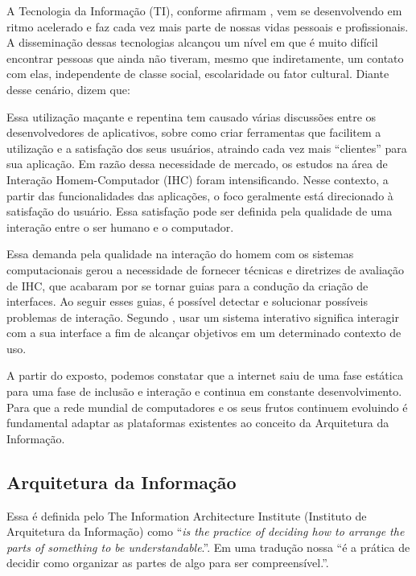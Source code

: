\documentclass[12pt]{article}
\begin{document}
A Tecnologia da Informação (TI), conforme afirmam , vem se desenvolvendo em ritmo acelerado e faz cada vez mais parte de nossas vidas pessoais e profissionais. A disseminação dessas tecnologias alcançou um nível em que é muito difícil encontrar pessoas que ainda não tiveram, mesmo que indiretamente, um contato com elas, independente de classe social, escolaridade ou fator cultural.
Diante desse cenário,   dizem que:
\begin{quoting}[rightmargin=0cm,leftmargin=4cm]
{\footnotesize 
Essa utilização maçante e repentina tem causado várias discussões entre os desenvolvedores de aplicativos, sobre como criar ferramentas que facilitem a utilização e a satisfação dos seus usuários, atraindo cada vez mais “clientes” para sua aplicação. Em razão dessa necessidade de mercado, os estudos na área de Interação Homem-Computador (IHC) foram intensificando. Nesse contexto, a partir das funcionalidades das aplicações, o foco geralmente está direcionado à satisfação do usuário. Essa satisfação pode ser definida pela qualidade de uma interação entre o ser humano e o computador.}	
\end{quoting}

Essa demanda pela qualidade na interação do homem com os sistemas computacionais gerou a necessidade de fornecer técnicas e diretrizes de avaliação de IHC, que acabaram por se tornar guias para a condução da criação de interfaces. Ao seguir esses guias, é possível detectar e solucionar possíveis problemas de interação. Segundo , usar um sistema interativo significa interagir com a sua interface a fim de alcançar objetivos em um determinado contexto de uso.

A partir do exposto, podemos constatar que a internet saiu de uma fase estática para uma fase de inclusão e interação e continua em constante desenvolvimento. Para que a rede mundial de computadores e os seus frutos continuem evoluindo é fundamental adaptar as plataformas existentes ao conceito da Arquitetura da Informação. 

\subsection{Arquitetura da Informação}
Essa é definida pelo The Information Architecture Institute (Instituto de Arquitetura da Informação) como “\textit{is the practice of deciding how to arrange the parts of something to be understandable}.”. Em uma tradução nossa “é a prática de decidir como organizar as partes de algo para ser compreensível.”.
\end{document}
